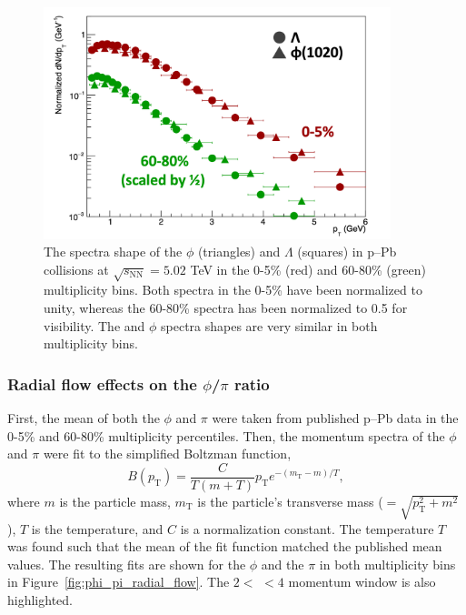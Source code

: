 \begin{figure}
    \centering
    \includegraphics[width=0.9\textwidth]{figures/analysis/lambda_phi_pt_comp.png}
    \caption{The \pt spectra shape of the $\phi$ (triangles) and $\Lambda$ (squares) in p--Pb collisions at $\sqrt{s_{\text{NN}}} = 5.02$ TeV in the 0-5\% (red) and 60-80\% (green) multiplicity bins. Both spectra in the 0-5\% have been normalized to unity, whereas the 60-80\% spectra has been normalized to 0.5 for visibility. The \lmb and $\phi$ spectra shapes are very similar in both multiplicity bins.}
    \label{fig:phi_lambda_pt}
\end{figure}

\subsubsection{Radial flow effects on the $\phi$/$\pi$ ratio}

First, the mean \pt of both the $\phi$ and $\pi$ were taken from published p--Pb data in the 0-5\% and 60-80\% multiplicity percentiles. Then, the momentum spectra of the $\phi$ and $\pi$ were fit to the simplified Boltzman function,
%
\begin{equation}
    \label{eq:boltz_eq}
    B\left(p_{\mathrm{T}}\right)=\frac{C}{T(m+T)} p_{\mathrm{T}}e^{-\left(m_{\mathrm{T}}-m\right) / T },
\end{equation}
where $m$ is the particle mass, $m_{\text{T}}$ is the particle's transverse mass ($= \sqrt{p_{\mathrm{T}}^{2}+m^{2}}$), $T$ is the temperature, and $C$ is a normalization constant. The temperature $T$ was found such that the mean \pt of the fit function matched the published mean \pt values. The resulting fits are shown for the $\phi$ and the $\pi$ in both multiplicity bins in Figure~\ref{fig:phi_pi_radial_flow}. The $2 <$ \pt $< 4$ \GeVc momentum window is also highlighted.

